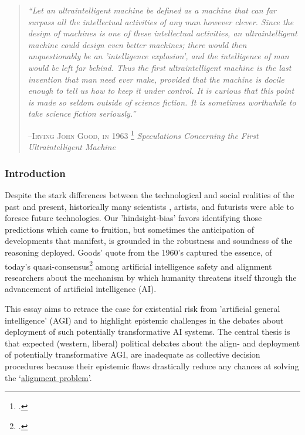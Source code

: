 \documentclass[12pt, a4paper]{article}
\begin{document}
\newpage  \tableofcontents      %
\newpage


    \begin{quote}
            \textit{“Let an ultraintelligent machine be defined as a machine that can far surpass all the intellectual activities of any man however clever. Since the design of machines is one of these intellectual activities, an ultraintelligent machine could design even better machines; there would then unquestionably be an 'intelligence explosion', and the intelligence of man would be left far behind. Thus the first ultraintelligent machine is the last invention that man need ever make, provided that the machine is docile enough to tell us how to keep it under control. It is curious that this point is made so seldom outside of science fiction. It is sometimes worthwhile to take science fiction seriously.” }
        \begin{flushright}
            \textsc{--Irving John Good, in 1963}   \footcite{good1966speculations}   \textit{Speculations Concerning the First Ultraintelligent Machine} 
        \end{flushright}
    \end{quote}

		\subsubsection{Introduction}
			Despite the stark differences between the technological and social realities of the past and present, historically many scientists , artists, and futurists were able to foresee future technologies.
			Our 'hindsight-bias' favors identifying those predictions which came to fruition, but sometimes the anticipation of developments that manifest, is grounded in the robustness and soundness of the reasoning deployed.
			Goods' quote from the 1960's captured the essence, of today's quasi-consensus\footcite{russell2009ethics} among artificial intelligence safety and alignment researchers about the mechanism by which humanity threatens itself through the advancement of artificial intelligence (AI).
			
			This essay aims to retrace the case for existential risk from 'artificial general intelligence' (AGI) and to highlight epistemic challenges in the debates about deployment of such potentially transformative AI systems.
			The central thesis is that expected (western, liberal) political debates about the align- and deployment of potentially transformative AGI, are inadequate as collective decision procedures because their epistemic flaws drastically reduce any chances at solving the ‘\hyperlink{alignmentp}{alignment problem}'.
			
\end{document}

